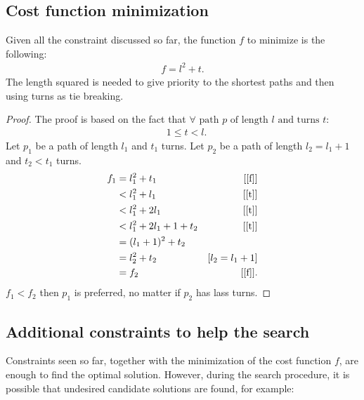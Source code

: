 \documentclass[12pt]{article}
\newcommand*{\itc}{\mathrel{:}} %
\begin{document}
\subsection{Cost function minimization}
Given all the constraint discussed so far, the function $f$ to minimize is the
following:
\begin{align}
  \label{f}
  f = l^2 + t.
\end{align}
The length squared is needed to give priority to the shortest paths and then
using turns as tie breaking.
\begin{proof}
  The proof is based on the fact that $\forall \text{ path } p \text{ of length
  $l$ and turns $t$} \itc$
  \begin{align}
    \label{t}
    & 1 \leq t < l.
  \end{align}
  Let $p_1$ be a path of length $l_1$ and $t_1$
  turns.
  Let $p_2$ be a path of length $l_2 = l_1 +1$ and $t_2 < t_1$ turns.
  \begin{align*}
    f_1
      &= l_1^2 + t_1
        &\text{[\eqref{f}]}\\
      & < l_1^2 + l_1
        &\text{[\eqref{t}]}\\
      & < l_1^2 + 2l_1
        &\text{[\eqref{t}]}\\
      & < l_1^2 + 2l_1 + 1 + t_2
        &\text{[\eqref{t}]}\\
      & = (l_1 + 1)^2 + t_2\\
      & =  l_2^2 + t_2
       &\text{[$l_2 = l_1 + 1$]}\\
      &= f_2
        &\text{[\eqref{f}]}.
  \end{align*}
$f_1 < f_2$ then $p_1$ is preferred, no matter if $p_2$ has lass turns.
\end{proof}

\subsection{Additional constraints to help the search}
Constraints seen so far, together with the minimization of the cost function
$f$, are enough to find the optimal solution. However, during the search
procedure, it is possible that undesired candidate solutions are found, for
example:
\end{document}
